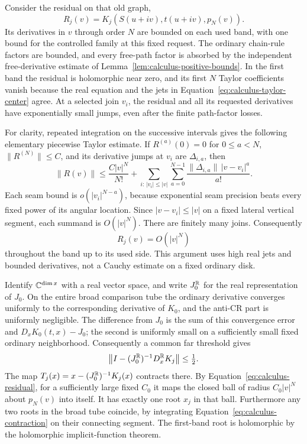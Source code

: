 Consider the residual on that old graph,
\[
 R_j(v)=K_j(S(u+iv),t(u+iv),p_N(v)).
\]
Its derivatives in $v$ through order $N$ are bounded on each used band,
with one bound for the controlled family at this fixed request.
The ordinary chain-rule factors are bounded, and every free-path factor
is absorbed by the independent free-derivative estimate of
Lemma~\ref{lem:calculus-positive-bounds}.  In the first band the residual
is holomorphic near zero, and its first $N$ Taylor coefficients vanish
because the real equation and the jets in
Equation~\eqref{eq:calculus-taylor-center} agree.  At a selected join
$v_i$, the residual and all its requested derivatives have exponentially
small jumps, even after the finite path-factor losses.

For clarity, repeated integration on the successive intervals gives the
following elementary piecewise Taylor estimate.  If $R^{(a)}(0)=0$ for
$0\le a<N$, $\|R^{(N)}\|\le C$, and its derivative jumps at $v_i$ are
$\Delta_{i,a}$, then
\begin{equation}
 \|R(v)\|
 \le \frac{C|v|^N}{N!}
   +\sum_{i:\,|v_i|\le |v|}\sum_{a=0}^{N-1}
       \frac{\|\Delta_{i,a}\|\,|v-v_i|^a}{a!}.
 \label{eq:calculus-piecewise-taylor}
\end{equation}
Each seam bound is $o(|v_i|^{N-a})$, because exponential seam precision
beats every fixed power of its angular location.  Since
$|v-v_i|\le |v|$ on a fixed lateral vertical segment, each summand is
$O(|v|^N)$.  There are finitely many joins.  Consequently
\begin{equation}
 R_j(v)=O(|v|^N)
 \label{eq:calculus-residual}
\end{equation}
throughout the band up to its used side.  This argument uses high real
jets and bounded derivatives, not a Cauchy estimate on a fixed ordinary
disk.

Identify $\mathbb{C}^{\dim x}$ with a real vector space, and write $J_0^{\mathbb{R}}$
for the real representation of $J_0$.  On the entire broad comparison
tube the ordinary derivative converges uniformly to the corresponding
derivative of $K_0$, and the anti-CR part is uniformly negligible.
The difference from $J_0$ is the sum of this convergence error and
$D_xK_0(t,x)-J_0$; the second is uniformly small on a sufficiently
small fixed ordinary neighborhood.  Consequently a common far threshold
gives
\begin{equation}
 \left\|I-(J_0^{\mathbb{R}})^{-1}D_x^{\mathbb{R}}K_j\right\|\le\tfrac12.
 \label{eq:calculus-contraction}
\end{equation}
The map $T_j(x)=x-(J_0^{\mathbb{R}})^{-1}K_j(x)$ contracts there.  By
Equation~\eqref{eq:calculus-residual}, for a sufficiently large fixed $C_0$
it maps the closed ball of radius $C_0|v|^N$ about $p_N(v)$ into itself.
It has exactly one root $x_j$ in that ball.  Furthermore any two roots
in the broad tube coincide, by integrating
Equation~\eqref{eq:calculus-contraction} on their connecting segment.
The first-band root is holomorphic by the holomorphic implicit-function
theorem.

